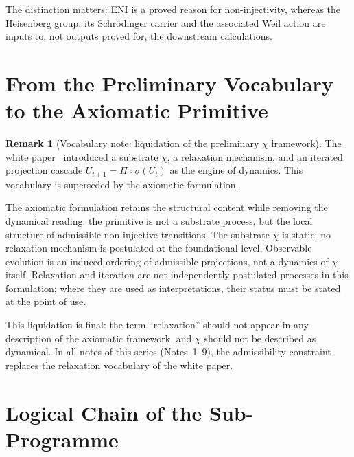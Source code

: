 \documentclass[11pt,a4paper]{article}
\theoremstyle{definition}
\newtheorem{remark}{Remark}
\begin{document}
    The distinction matters: ENI is a proved reason for non-injectivity, whereas the
    Heisenberg group, its Schr\"odinger carrier and the associated Weil action are inputs to, not
    outputs proved for, the downstream calculations.

  \section{From the Preliminary Vocabulary to the Axiomatic Primitive}
    \label{sec:vocab}

    \begin{remark}[Vocabulary note: liquidation of the preliminary $\chi$ framework]
      The white paper~\cite{Cosmochrony} introduced a substrate $\chi$, a relaxation
      mechanism, and an iterated projection cascade $U_{t+1} = \Pi \circ \sigma(U_t)$ as
      the engine of dynamics.
      This vocabulary is superseded by the axiomatic formulation.

      The axiomatic formulation retains the structural content while removing the dynamical
      reading:
      the primitive is not a substrate process, but the local structure of admissible
      non-injective transitions.
      The substrate $\chi$ is static; no relaxation mechanism is postulated at the
      foundational level.
      Observable evolution is an induced ordering of admissible projections, not a
      dynamics of $\chi$ itself.
      Relaxation and iteration are not independently postulated processes in this
      formulation; where they are used as interpretations, their status must be stated at
      the point of use.

      This liquidation is final: the term ``relaxation'' should not appear in any description of
      the axiomatic framework, and $\chi$ should not be described as dynamical.
      In all notes of this series (Notes~1--9), the admissibility constraint replaces the
      relaxation vocabulary of the white paper.
    \end{remark}

  \section{Logical Chain of the Sub-Programme}
    \label{sec:chain}
\end{document}
